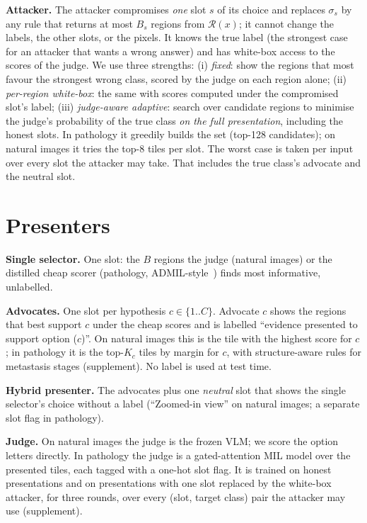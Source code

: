 \documentclass[10pt,twocolumn,letterpaper]{article}
\begin{document}
\textbf{Attacker.} The attacker compromises \emph{one} slot $s$ of its choice and replaces $\sigma_s$ by any rule that returns at most $B_s$ regions from $\mathcal{R}(x)$; it cannot change the labels, the other slots, or the pixels. It knows the true label (the strongest case for an attacker that wants a wrong answer) and has white-box access to the scores of the judge. We use three strengths:
(i) \emph{fixed}: show the regions that most favour the strongest wrong class, scored by the judge on each region alone;
(ii) \emph{per-region white-box}: the same with scores computed under the compromised slot's label;
(iii) \emph{judge-aware adaptive}: search over candidate regions to minimise the judge's probability of the true class \emph{on the full presentation}, including the honest slots. In pathology it greedily builds the set (top-128 candidates); on natural images it tries the top-8 tiles per slot.
The worst case is taken per input over every slot the attacker may take. That includes the true class's advocate and the neutral slot.

\section{Presenters}\label{sec:method}
\textbf{Single selector.} One slot: the $B$ regions the judge (natural images) or the distilled cheap scorer (pathology, ADMIL-style~\cite{admil2026}) finds most informative, unlabelled.

\textbf{Advocates.} One slot per hypothesis $c\in\{1..C\}$. Advocate $c$ shows the regions that best support $c$ under the cheap scores and is labelled ``evidence presented to support option ($c$)''. On natural images this is the tile with the highest score for $c$; in pathology it is the top-$K_c$ tiles by margin for $c$, with structure-aware rules for metastasis stages (supplement). No label is used at test time.

\textbf{Hybrid presenter.} The advocates plus one \emph{neutral} slot that shows the single selector's choice without a label (``Zoomed-in view'' on natural images; a separate slot flag in pathology).

\textbf{Judge.} On natural images the judge is the frozen VLM; we score the option letters directly. In pathology the judge is a gated-attention MIL model over the presented tiles, each tagged with a one-hot slot flag. It is trained on honest presentations and on presentations with one slot replaced by the white-box attacker, for three rounds, over every (slot, target class) pair the attacker may use (supplement).
\end{document}
